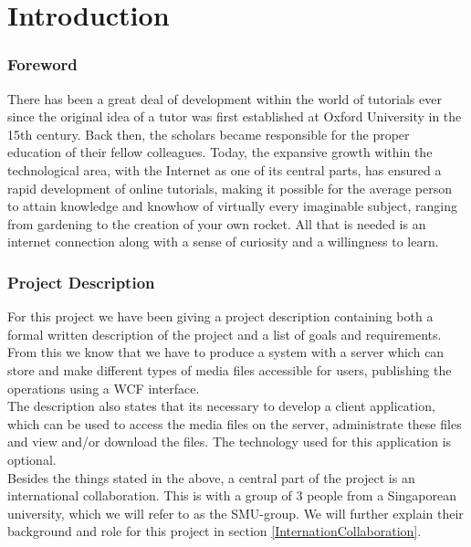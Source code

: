 \part{Introduction}
\section{Foreword}
There has been a great deal of development within the world of tutorials ever since the original idea of a tutor was first established at Oxford University in the 15th century. Back then, the scholars became responsible for the proper education of their fellow colleagues. Today, the expansive growth within the technological area, with the Internet as one of its central parts, has ensured a rapid development of online tutorials, making it possible for the average person to attain knowledge and knowhow of virtually every imaginable subject, ranging from gardening to the creation of your own rocket.
All that is needed is an internet connection along with a sense of curiosity and a willingness to learn.\\


\section{Project Description}
For this project we have been giving a project description containing both a formal written description of the project and a list of goals and requirements. From this we know that we have to produce a system with a server which can store and make different types of media files accessible for users, publishing the operations using a WCF interface.\\
The description also states that its necessary to develop a client application, which can be used to access the media files on the server, administrate these files and view and/or download the files. The technology used for this application is optional.\\ 
Besides the things stated in the above, a central part of the project is an international collaboration. This 	is with a group of 3 people from a Singaporean university, which we will refer to as the SMU-group. We will further explain their background and role for this project in section \ref{InternationCollaboration}. \\


